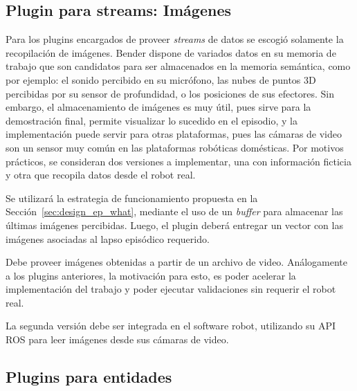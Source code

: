 \subsection{Plugin para streams: Imágenes}

Para los plugins encargados de proveer \textit{streams} de datos se escogió solamente la recopilación de imágenes. Bender dispone de variados datos en su memoria de trabajo que son candidatos para ser almacenados en la memoria semántica, como por ejemplo: el sonido percibido en su micrófono, las nubes de puntos 3D percibidas por su sensor de profundidad, o los posiciones de sus efectores. Sin embargo, el almacenamiento de imágenes es muy útil, pues sirve para la demostración final, permite visualizar lo sucedido en el episodio, y la implementación puede servir para otras plataformas, pues las cámaras de video son un sensor muy común en las plataformas robóticas domésticas. Por motivos prácticos, se consideran dos versiones a implementar, una con información ficticia y otra que recopila datos desde el robot real.

Se utilizará la estrategia de funcionamiento propuesta en la Sección~\ref{sec:design_ep_what}, mediante el uso de un \textit{buffer} para almacenar las últimas imágenes percibidas. Luego, el plugin deberá entregar un vector con las imágenes asociadas al lapso episódico requerido.

Debe proveer imágenes obtenidas a partir de un archivo de video. Análogamente a los plugins anteriores, la motivación para esto, es poder acelerar la implementación del trabajo y poder ejecutar validaciones sin requerir el robot real.

La segunda versión debe ser integrada en el software robot, utilizando su API ROS para leer imágenes desde sus cámaras de video.

\subsection{Plugins para entidades}

